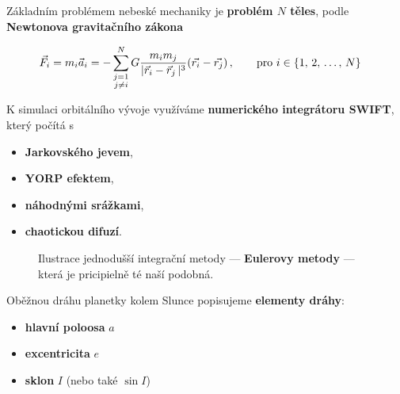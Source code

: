 \documentclass{beamer}
\newlength{\sep}
\newlength{\vyska}
\newlength{\vyskaA}
\newlength{\side}
\begin{document}
\begin{frame}
\begin{columns}[t]
\begin{column}{\side}
\vspace{\sep}

	\begin{tcolorbox}[title=Metody nebeské mechaniky\phantom{Úy},height=0.665\vyskaA]

		Základním problémem nebeské mechaniky je \textbf{problém $N$ těles}, podle \textbf{Newtonova gravitačního zákona}

		{\footnotesize
		\begin{align*} 
			\vec{F}_i = m_i\vec{a}_i &= -\sum_{\substack{j=1 \\ j\neq i}}^N G\frac{m_im_j}{\lvert \vec{r}_i-\vec{r}_j \,\rvert^3}(\vec{r_i}-\vec{r_j})\,, \qquad{\rm pro}\ i\in\{1,\,2,\,\dots,\,N\}
		\end{align*}}

K simulaci orbitálního vývoje využíváme \textbf{numerického integrátoru SWIFT}, který počítá s 

\begin{itemize}
	\item \textbf{Jarkovského jevem},
	\item \textbf{YORP efektem},
	\item \textbf{náhodnými srážkami},
	\item \textbf{chaotickou difuzí}.  
\end{itemize}

		\begin{figure}[!htb]
			\centering 
			\begin{subfigure}[b]{0.45\textwidth}
			\centering 
			\end{subfigure}
			\begin{subfigure}[b]{0.45\textwidth}
			\centering 
			\end{subfigure}
			\caption{Ilustrace jednodušší integrační metody --- \textbf{Eulerovy metody} --- která je pricipielně té naší podobná.}
		\end{figure}
		Oběžnou dráhu planetky kolem Slunce popisujeme \textbf{elementy dráhy}:
		\begin{itemize}
			\item \textbf{hlavní poloosa} $a$
			\item \textbf{excentricita} $e$
			\item \textbf{sklon} $I$ (nebo také $\sin I$) 
		\end{itemize}


\end{tcolorbox}
\end{column}
\end{columns}
\end{frame}
\end{document}
